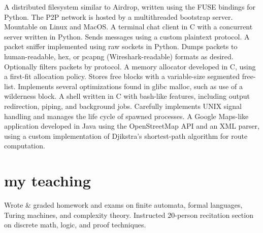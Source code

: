 \documentclass{cv}
\begin{document}
\begin{entrylist}
    {A distributed filesystem similar to Airdrop, written using the FUSE bindings for Python. The P2P network is hosted by a multithreaded bootstrap server. Mountable on Linux and MacOS.}
    {A terminal chat client in C with a concurrent server written in Python. Sends messages using a custom plaintext protocol.}
    {A packet sniffer implemented using raw sockets in Python. Dumps packets to human-readable, hex, or pcapng (Wireshark-readable) formats as desired. Optionally filters packets by protocol.}
    {A memory allocator developed in C, using a first-fit allocation policy. Stores free blocks with a variable-size segmented free-list. Implements several optimizations found in glibc malloc, such as use of a wilderness block.}
    {A shell written in C with bash-like features, including output redirection, piping, and background jobs. Carefully implements UNIX signal handling and manages the life cycle of spawned processes.}
    {A Google Maps-like application developed in Java using the OpenStreetMap API and an XML parser, using a custom implementation of Djikstra's shortest-path algorithm for route computation.}
\end{entrylist}

\section{my teaching}

\begin{entrylist}
    {Wrote \& graded homework and exams on finite automata, formal languages, Turing machines, and complexity theory.}
    {Instructed 20-person recitation section on discrete math, logic, and proof techniques.}
\end{entrylist}
\end{document}
